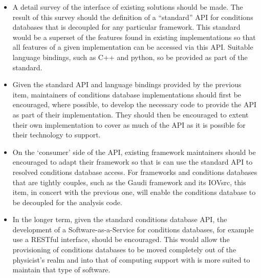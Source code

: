 \begin{itemize}
\item A detail survey of the interface of existing solutions should be made. The result of this survey should the definition of a ``standard'' API for conditions databases that is decoupled for any particular framework. This standard would be a superset of the features found in existing implementations so that all features of a given implementation can be accessed via this API. Suitable language bindings, such as C++ and python, so be provided as part of the standard.

\item Given the standard API and language bindings provided by the previous item, maintainers of conditions database implementations should first be encouraged, where possible, to develop the necessary code to provide the API as part of their implementation. They should then be encouraged to extent their own implementation to cover as much of the API as it is possible for their technology to support.

\item On the `consumer' side of the API, existing framework maintainers should be encouraged to adapt their framework so that is can use the standard API to resolved conditions database access. For frameworks and conditions databases that are tightly couples, such as the Gaudi framework and its IOVsrc, this item, in concert with the previous one, will enable the conditions database to be decoupled for the analysis code.

\item In the longer term, given the standard conditions database API, the development of a Software-as-a-Service for conditions databases, for example use a RESTful interface, should be encouraged. This would allow the provisioning of conditions databases to be moved completely out of the physicist's realm and into that of computing support with is more suited to maintain that type of software.
\end{itemize}
